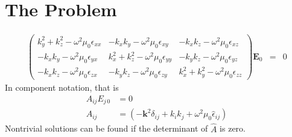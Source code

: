 \documentclass[12pt,a4paper,twoside,openright,BCOR10mm,headsepline,titlepage,abstracton,chapterprefix,final]{scrreprt}
\newcommand\Vector[1]{{\mathbf{#1}}}
\newcommand\vacuum{0}
\newcommand\wavenumber{k}
\newcommand\Tensor[1]{\hat{#1}}
\newcommand\scalarEfield{E}
\newcommand\Efield{\Vector{\scalarEfield}}
\newcommand\vacuumpermeability{\mu_{\vacuum}}
\newcommand\permittivity{\Tensor{\epsilon}}
\newcommand\scalarpermittivity{\epsilon}
\begin{document}
\section{The Problem}
\begin{eqnarray}
\begin{pmatrix}
 \wavenumber_y^2 + \wavenumber_z^2 - \omega^2 \vacuumpermeability \scalarpermittivity_{xx} 
 &
 - \wavenumber_x \wavenumber_y - \omega^2 \vacuumpermeability \scalarpermittivity_{xy}
 &
 - \wavenumber_x \wavenumber_z - \omega^2 \vacuumpermeability \scalarpermittivity_{xz}
 \\
 - \wavenumber_x \wavenumber_y - \omega^2 \vacuumpermeability \scalarpermittivity_{yx}
 &
 \wavenumber_x^2 + \wavenumber_z^2 - \omega^2 \vacuumpermeability \scalarpermittivity_{yy} 
 &
 - \wavenumber_y \wavenumber_z - \omega^2 \vacuumpermeability \scalarpermittivity_{yz}
 \\
 - \wavenumber_x \wavenumber_z - \omega^2 \vacuumpermeability \scalarpermittivity_{zx}
 &
 - \wavenumber_y \wavenumber_z - \omega^2 \vacuumpermeability \scalarpermittivity_{zy}
 &
 \wavenumber_x^2 + \wavenumber_y^2 - \omega^2 \vacuumpermeability \scalarpermittivity_{zz}  
\end{pmatrix}
\Efield_0
&=& 0 \label{eq:generalDispersionEigenEquation}
\end{eqnarray}
In component notation, that is
\begin{align}
 A_{ij} E_{j\,0} &= 0 \label{eq:generalDispersionEigenEquationindex}\\
 A_{ij}          &= \left(-\Vector{k}^2 \delta_{ij} + k_i k_j + \omega^2 \vacuumpermeability \permittivity_{ij} \right)
\end{align}
Nontrivial solutions can be found if the determinant of $\hat{A}$ is zero.
\end{document}

